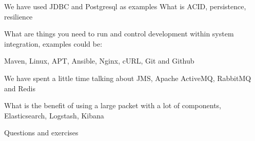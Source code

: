 \documentclass[Screen16to9,17pt]{foils}
\begin{document}
We have used JDBC and Postgresql as examples
What is ACID, persistence, resilience


What are things you need to run and control development within system integration, examples could be:

Maven, Linux, APT, Ansible, Nginx, cURL, Git and Github


We have spent a little time talking about
JMS, Apache ActiveMQ, RabbitMQ and Redis


What is the benefit of using a large packet with a lot of components, Elasticsearch, Logstash, Kibana





Questions and exercises
\end{document}
